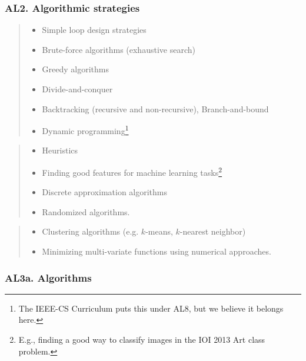 \documentclass[a4paper,11pt,oneside]{article}
\newcommand{\cmark}{\ding{51}}%
\newcommand{\xmark}{\ding{55}}%
\newcommand{\CC}[1]{#1}
\newcommand{\Ccodeonly}{{\small\cmark\faFileText}}
\newcommand{\Cnofocus}{{\small\faQuestion}}
\newcommand{\Cexcluded}{{\small\xmark}}
\newcommand{\Icodeonly}{\item[\hbox to 1.8em{\Ccodeonly\hfill}]}
\newcommand{\Inofocus}{\item[\hbox to 1.8em{\Cnofocus\hfill}]}
\newcommand{\Iexcluded}{\item[\hbox to 1.8em{\Cexcluded\hfill}]}
\newenvironment{myitemize}{\begin{quote}\begin{itemize}\itemsep 0pt}{\end{itemize}\end{quote}}
\begin{document}
    \subsubsection*{AL2. Algorithmic strategies}%

    \begin{myitemize}
    \Icodeonly Simple loop design strategies
    \Icodeonly\CC{Brute-force algorithms} (exhaustive search)
    \Icodeonly\CC{Greedy algorithms}
    \Icodeonly\CC{Divide-and-conquer}
    \Icodeonly\CC{Backtracking} (recursive and non-recursive), \CC{Branch-and-bound}
    \Icodeonly\CC{Dynamic programming}\footnote{The IEEE-CS Curriculum puts this under AL8, but we believe it belongs here.} 
    \end{myitemize}
  
    \begin{myitemize}
    \Inofocus Heuristics
    \Inofocus Finding good features for machine learning tasks\footnote{E.g., finding a good way to classify images in the IOI 2013 Art class problem.}
    \Inofocus Discrete approximation algorithms
    \Inofocus Randomized algorithms.
    \end{myitemize}
  
    \begin{myitemize}
    \Iexcluded Clustering algorithms (e.g. $k$-means, $k$-nearest neighbor)
    \Iexcluded Minimizing multi-variate functions using numerical approaches.
    \end{myitemize}
  
    \subsubsection*{AL3a. Algorithms}%
\end{document}
